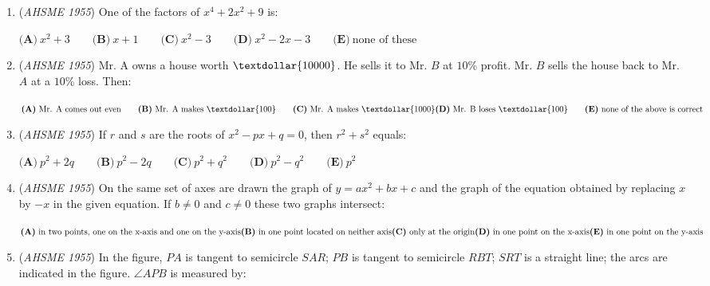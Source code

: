 \begin{enumerate}
 $\textbf{(A)}\ \text{always increases as }x\text{ increases}\\ \textbf{(B)}\ \text{always decreases as }x\text{ decreases to 1}\\ \textbf{(C)}\ \text{cannot equal 0}\\ \textbf{(D)}\ \text{has a maximum value when }x\text{ is negative}\\ \textbf{(E)}\ \text{has a minimum value of-10}$


	\item (\textit{AHSME 1955}) One of the factors of $x^4+2x^2+9$ is: 


 $\textbf{(A)}\ x^2+3\qquad\textbf{(B)}\ x+1\qquad\textbf{(C)}\ x^2-3\qquad\textbf{(D)}\ x^2-2x-3\qquad\textbf{(E)}\ \text{none of these}$


	\item (\textit{AHSME 1955}) Mr. A owns a house worth $\textdollar{10000}$. He sells it to Mr. $B$ at $10$\% profit. Mr. $B$ sells the house back to Mr. $A$ at a $10$\% loss. Then: 


 $\textbf{(A)}\ \text{Mr. A comes out even}\qquad\textbf{(B)}\ \text{Mr. A makes } \textdollar{ 100}\qquad\textbf{(C)}\ \text{Mr. A makes } \textdollar{ 1000}\\ \textbf{(D)}\ \text{Mr. B loses } \textdollar{ 100}\qquad\textbf{(E)}\ \text{none of the above is correct}$


	\item (\textit{AHSME 1955}) If $r$ and $s$ are the roots of $x^2-px+q=0$, then $r^2+s^2$ equals: 


 $\textbf{(A)}\ p^2+2q\qquad\textbf{(B)}\ p^2-2q\qquad\textbf{(C)}\ p^2+q^2\qquad\textbf{(D)}\ p^2-q^2\qquad\textbf{(E)}\ p^2$


	\item (\textit{AHSME 1955}) On the same set of axes are drawn the graph of $y=ax^2+bx+c$ and the graph of the equation obtained by replacing $x$ by $-x$ in the given equation. 
If $b \neq 0$ and $c \neq 0$ these two graphs intersect: 


 $\textbf{(A)}\ \text{in two points, one on the x-axis and one on the y-axis}\\ \textbf{(B)}\ \text{in one point located on neither axis}\\ \textbf{(C)}\ \text{only at the origin}\\ \textbf{(D)}\ \text{in one point on the x-axis}\\ \textbf{(E)}\ \text{in one point on the y-axis}$


	\item (\textit{AHSME 1955}) In the figure, $PA$ is tangent to semicircle $SAR$; $PB$ is tangent to semicircle $RBT$; $SRT$ is a straight line; 
the arcs are indicated in the figure. $\angle APB$ is measured by: 



\end{enumerate}
